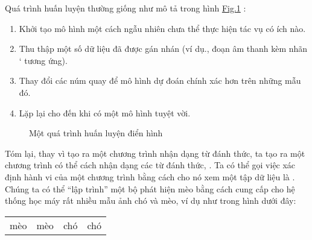 \documentclass[letterpaper,11pt,english]{sphinxmanual}
\begin{document}
Quá trình huấn luyện thường giống như mô tả trong hình
\hyperref[\detokenize{chapter_introduction/index_vn:fig-ml-loop}]{Fig.\@ \ref{\detokenize{chapter_introduction/index_vn:fig-ml-loop}}} :


\begin{enumerate}
%
\item {} 
Khởi tạo mô hình một cách ngẫu nhiên chưa thể thực hiện tác vụ có ích
nào.

\item {} 
Thu thập một số dữ liệu đã được gán nhán (ví dụ., đoạn âm thanh kèm
nhãn {}` tương ứng).

\item {} 
Thay đổi các núm quay để mô hình dự đoán chính xác hơn trên những mẫu
đó.

\item {} 
Lặp lại cho đến khi có một mô hình tuyệt vời.

\end{enumerate}



\begin{figure}[H]
\centering
\capstart

\noindent{}
\caption{Một quá trình huấn luyện điển hình}\label{\detokenize{chapter_introduction/index_vn:id10}}\label{\detokenize{chapter_introduction/index_vn:fig-ml-loop}}\end{figure}







Tóm lại, thay vì tạo ra một chương trình nhận dạng từ đánh thức, ta tạo
ra một chương trình có thể  cách nhận dạng các từ đánh thức, . Ta có thể gọi
việc xác định hành vi của một chương trình bằng cách cho nó xem một tập
dữ liệu là . Chúng ta có thể “lập trình” một bộ
phát hiện mèo bằng cách cung cấp cho hệ thống học máy rất nhiều mẫu ảnh
chó và mèo, ví dụ như trong hình dưới đây:




\begin{savenotes}\sphinxattablestart
\centering
\begin{tabulary}{\linewidth}[t]{|T|T|T|T|}
\hline
\sphinxstyletheadfamily 
{}
&\sphinxstyletheadfamily 
{}
&\sphinxstyletheadfamily 
{}
&\sphinxstyletheadfamily 
{}
\\
\hline
mèo
&
mèo
&
chó
&
chó
\\
\hline
\end{tabulary}
\par
\sphinxattableend\end{savenotes}
\end{document}
